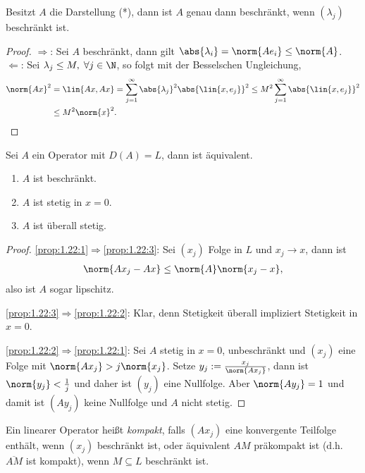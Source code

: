 \begin{lem}
\label{prop:1.21}
Besitzt $A$ die Darstellung (*), dann ist $A$ genau dann beschränkt, wenn
$(\lambda_j)$ beschränkt ist.\fishhere
\end{lem}
\begin{proof}
$\Rightarrow$: Sei $A$ beschränkt, dann gilt $\abs{\lambda_i} = \norm{Ae_i} \le
\norm{A}$.\\
$\Leftarrow$: Sei $\lambda_j\le M,\;\forall j\in\N$, so folgt mit der
Besselschen Ungleichung,
\begin{align*}
\norm{Ax}^2 &= \lin{Ax,Ax} =
\sum\limits_{j=1}^\infty\abs{\lambda_j}^2\abs{\lin{x,e_j}}^2
\le M^2 \sum\limits_{j=1}^\infty \abs{\lin{x,e_j}}^2 \\
&\le M^2\norm{x}^2.\qedhere
\end{align*}
\end{proof}

\begin{prop}
\label{prop:1.22}
Sei $A$ ein Operator mit $D(A) = L$, dann ist äquivalent.
\begin{enumerate}[label=(\roman{*})]
  \item\label{prop:1.22:1} $A$ ist beschränkt.
  \item\label{prop:1.22:2} $A$ ist stetig in $x=0$.
  \item\label{prop:1.22:3} $A$ ist überall stetig.\fishhere
\end{enumerate}
\end{prop}
\begin{proof}
\ref{prop:1.22:1}$\Rightarrow$\ref{prop:1.22:3}: Sei $(x_j)$ Folge in $L$ und
$x_j\to x$, dann ist
\begin{align*}
\norm{Ax_j-Ax} \le \norm{A}\norm{x_j-x},
\end{align*}
also ist $A$ sogar lipschitz.

\ref{prop:1.22:3}$\Rightarrow$\ref{prop:1.22:2}: Klar, denn Stetigkeit überall
impliziert Stetigkeit in $x=0$.

\ref{prop:1.22:2}$\Rightarrow$\ref{prop:1.22:1}: Sei $A$ stetig in $x=0$,
unbeschränkt und $(x_j)$ eine Folge mit $\norm{Ax_j}>j\norm{x_j}$. Setze $y_j :=
\frac{x_j}{\norm{Ax_j}}$, dann ist $\norm{y_j} < \frac{1}{j}$ und daher ist
$(y_j)$ eine Nullfolge. Aber $\norm{Ay_j} = 1$ und damit ist $(Ay_j)$ keine
Nullfolge und $A$ nicht stetig.\qedhere
\end{proof}

\begin{defn}
\label{defn:1.23}
Ein linearer Operator heißt \emph{kompakt}, falls $(Ax_j)$ eine konvergente
Teilfolge enthält, wenn $(x_j)$ beschränkt ist, oder äquivalent $AM$ präkompakt
ist (d.h. $\overline{AM}$ ist kompakt), wenn $M\subseteq L$ beschränkt
ist.\fishhere
\end{defn}

